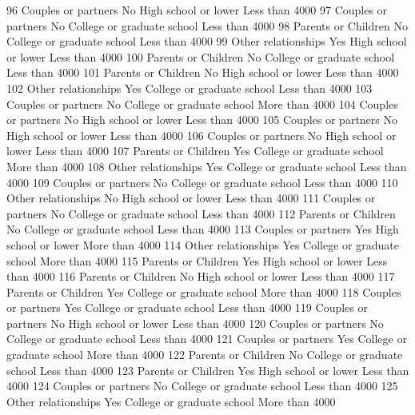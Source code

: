 \documentclass[
  letterpaper,
  DIV=11,
  numbers=noendperiod]{scrreprt}
\newenvironment{Shaded}{\begin{snugshade}}{\end{snugshade}}
\newcommand{\NormalTok}[1]{\textcolor[rgb]{0.00,0.23,0.31}{#1}}
\begin{document}
\begin{Shaded}
\begin{Highlighting}[]
\NormalTok{96  Couples or partners       No       High school or lower Less than 4000}
\NormalTok{97  Couples or partners       No College or graduate school Less than 4000}
\NormalTok{98  Parents or Children       No College or graduate school Less than 4000}
\NormalTok{99  Other relationships      Yes       High school or lower Less than 4000}
\NormalTok{100 Parents or Children       No College or graduate school Less than 4000}
\NormalTok{101 Parents or Children       No       High school or lower Less than 4000}
\NormalTok{102 Other relationships      Yes College or graduate school Less than 4000}
\NormalTok{103 Couples or partners       No College or graduate school More than 4000}
\NormalTok{104 Couples or partners       No       High school or lower Less than 4000}
\NormalTok{105 Couples or partners       No       High school or lower Less than 4000}
\NormalTok{106 Couples or partners       No       High school or lower Less than 4000}
\NormalTok{107 Parents or Children      Yes College or graduate school More than 4000}
\NormalTok{108 Other relationships      Yes College or graduate school Less than 4000}
\NormalTok{109 Couples or partners       No College or graduate school Less than 4000}
\NormalTok{110 Other relationships       No       High school or lower Less than 4000}
\NormalTok{111 Couples or partners       No College or graduate school Less than 4000}
\NormalTok{112 Parents or Children       No College or graduate school Less than 4000}
\NormalTok{113 Couples or partners      Yes       High school or lower More than 4000}
\NormalTok{114 Other relationships      Yes College or graduate school More than 4000}
\NormalTok{115 Parents or Children      Yes       High school or lower Less than 4000}
\NormalTok{116 Parents or Children       No       High school or lower Less than 4000}
\NormalTok{117 Parents or Children      Yes College or graduate school More than 4000}
\NormalTok{118 Couples or partners      Yes College or graduate school Less than 4000}
\NormalTok{119 Couples or partners       No       High school or lower Less than 4000}
\NormalTok{120 Couples or partners       No College or graduate school Less than 4000}
\NormalTok{121 Couples or partners      Yes College or graduate school More than 4000}
\NormalTok{122 Parents or Children       No College or graduate school Less than 4000}
\NormalTok{123 Parents or Children      Yes       High school or lower Less than 4000}
\NormalTok{124 Couples or partners       No College or graduate school Less than 4000}
\NormalTok{125 Other relationships      Yes College or graduate school More than 4000}

\end{Highlighting}
\end{Shaded}
\end{document}
